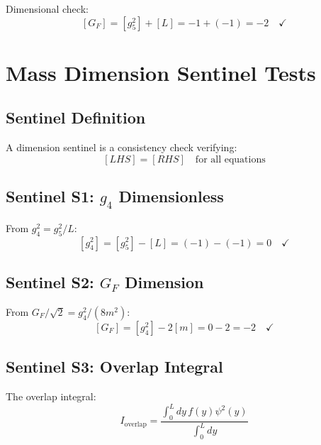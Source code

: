 \documentclass[11pt,a4paper]{article}
\begin{document}
Dimensional check:
\begin{equation}
\label{eq:gf-dim-final}
[G_F] = [g_5^2] + [L] = -1 + (-1) = -2 \quad \checkmark
\end{equation}

\section{Mass Dimension Sentinel Tests}
\label{sec:dim-sentinels}

\subsection{Sentinel Definition}
\label{subsec:sentinel-def}

A dimension sentinel is a consistency check verifying:
\begin{equation}
\label{eq:sentinel-def}
[LHS] = [RHS] \quad \text{for all equations}
\end{equation}

\subsection{Sentinel S1: $g_4$ Dimensionless}
\label{subsec:sentinel-g4}

From $g_4^2 = g_5^2 / L$:
\begin{equation}
\label{eq:s1-check}
[g_4^2] = [g_5^2] - [L] = (-1) - (-1) = 0 \quad \checkmark
\end{equation}

\subsection{Sentinel S2: $G_F$ Dimension}
\label{subsec:sentinel-gf}

From $G_F / \sqrt{2} = g_4^2 / (8 m^2)$:
\begin{equation}
\label{eq:s2-check}
[G_F] = [g_4^2] - 2[m] = 0 - 2 = -2 \quad \checkmark
\end{equation}

\subsection{Sentinel S3: Overlap Integral}
\label{subsec:sentinel-overlap}

The overlap integral:
\begin{equation}
\label{eq:overlap-def}
I_{\text{overlap}} = \frac{\int_0^L dy \, f(y) \psi^2(y)}{\int_0^L dy}
\end{equation}
\end{document}

